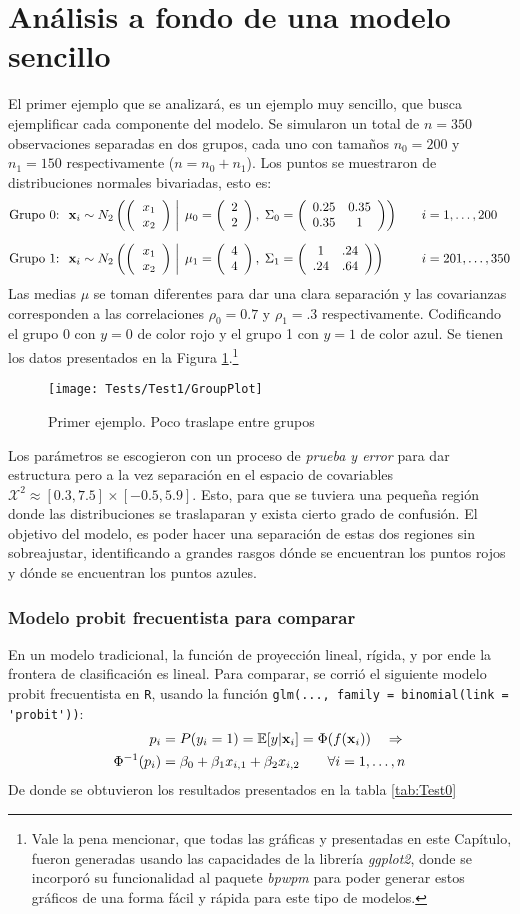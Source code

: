 \documentclass[../Main/Main.tex]{subfiles}
\begin{document}
\section{Análisis a fondo de una modelo sencillo} \label{sec:Test1}
El primer ejemplo que se analizará, es un ejemplo muy sencillo, que busca ejemplificar cada componente del modelo. Se simularon un total de $n = 350$ observaciones separadas en dos grupos, cada uno con tamaños $n_{0} = 200$ y  $n_{1} = 150$ respectivamente ($n = n_0 + n_1$). Los puntos se muestraron de distribuciones normales bivariadas, esto es:
\begin{align*}
\text{Grupo 0: } \;
&\xsn_i \sim \normbivar{2}{2}{0.25}{0.35}{1}{0} \quad
& &i = 1,\ldots,200 \\[6pt]
\text{Grupo 1: } \;
&\xsn_i \sim \normbivar{4}{4}{1}{.24}{.64}{1} \quad
& &i = 201,\ldots,350
\end{align*}
Las medias $\mu$ se toman diferentes para dar una clara separación y las covarianzas corresponden a las correlaciones $\rho_0 = 0.7$ y $\rho_1 = .3$ respectivamente. Codificando el grupo 0 con $y = 0$ de color rojo y el grupo 1 con $y = 1$ de color azul. Se tienen los datos presentados en la Figura \ref{fig:Test1Plot}.\footnote{Vale la pena mencionar, que todas las gráficas y presentadas en este Capítulo, fueron generadas usando las capacidades de la librería \textit{ggplot2}, donde se incorporó su funcionalidad al paquete \textit{bpwpm} para poder generar estos gráficos de una forma fácil y rápida para este tipo de modelos.}
\begin{figure}[h]
  \centering
      \texttt{[image: Tests/Test1/GroupPlot]}
  \caption{Primer ejemplo. Poco traslape entre grupos}
 \label{fig:Test1Plot}
\end{figure}
Los parámetros se escogieron con un proceso de \textit{prueba y error} para dar estructura pero a la vez separación en el espacio de covariables $\mathcal{X}^2 \approx [0.3,7.5]\times[-0.5,5.9]$. Esto, para que se tuviera una pequeña región donde las distribuciones se traslaparan y exista cierto grado de confusión. El objetivo del modelo, es poder hacer una separación de estas dos regiones sin sobreajustar, identificando a grandes rasgos dónde se encuentran los puntos rojos y dónde se encuentran los puntos azules.

\subsubsection*{Modelo probit frecuentista para comparar}
En un modelo tradicional, la función de proyección lineal, rígida, y por ende la frontera de clasificación es lineal. Para comparar, se corrió el siguiente modelo probit frecuentista en \verb|R|, usando la función \verb|glm(..., family = binomial(link = 'probit'))|:
\begin{align}
	p_i & = P(y_i = 1) =\E[y|\xni] = \Phi(f(\xni))  \quad \Rightarrow  			\nonumber \\
	\Phi^{-1}(p_i) &= \beta_0 + \beta_1x_{i,1} + \beta_2x_{i,2} 
	\qquad 	\forall i =1,\ldots,n \label{ec:Test1ModGLM}
\end{align}
De donde se obtuvieron los resultados presentados en la tabla \ref{tab:Test0}
\end{document}

